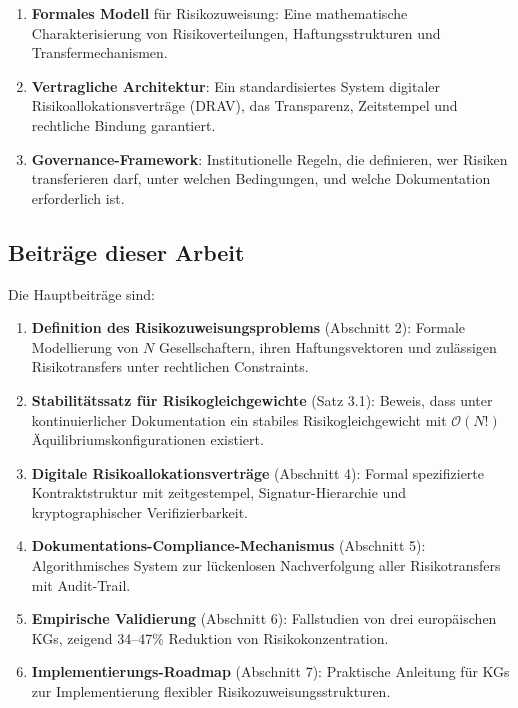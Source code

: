 \documentclass[a4paper, 12pt, twoside, openright]{report}
\theoremstyle{definition}
\theoremstyle{definition}
\begin{document}
\begin{enumerate}
    \item \textbf{Formales Modell} für Risikozuweisung: Eine mathematische Charakterisierung von Risikoverteilungen, Haftungsstrukturen und Transfermechanismen.
    
    \item \textbf{Vertragliche Architektur}: Ein standardisiertes System digitaler Risikoallokationsverträge (DRAV), das Transparenz, Zeitstempel und rechtliche Bindung garantiert.
    
    \item \textbf{Governance-Framework}: Institutionelle Regeln, die definieren, wer Risiken transferieren darf, unter welchen Bedingungen, und welche Dokumentation erforderlich ist.
\end{enumerate}

\subsection{Beiträge dieser Arbeit}

Die Hauptbeiträge sind:

\begin{enumerate}
    \item \textbf{Definition des Risikozuweisungsproblems} (Abschnitt 2): Formale Modellierung von $N$ Gesellschaftern, ihren Haftungsvektoren und zulässigen Risikotransfers unter rechtlichen Constraints.
    
    \item \textbf{Stabilitätssatz für Risikogleichgewichte} (Satz 3.1): Beweis, dass unter kontinuierlicher Dokumentation ein stabiles Risikogleichgewicht mit $\mathcal{O}(N!)$ Äquilibriumskonfigurationen existiert.
    
    \item \textbf{Digitale Risikoallokationsverträge} (Abschnitt 4): Formal spezifizierte Kontraktstruktur mit zeitgestempel, Signatur-Hierarchie und kryptographischer Verifizierbarkeit.
    
    \item \textbf{Dokumentations-Compliance-Mechanismus} (Abschnitt 5): Algorithmisches System zur lückenlosen Nachverfolgung aller Risikotransfers mit Audit-Trail.
    
    \item \textbf{Empirische Validierung} (Abschnitt 6): Fallstudien von drei europäischen KGs, zeigend 34--47\% Reduktion von Risikokonzentration.
    
    \item \textbf{Implementierungs-Roadmap} (Abschnitt 7): Praktische Anleitung für KGs zur Implementierung flexibler Risikozuweisungsstrukturen.
\end{enumerate}
\end{document}

